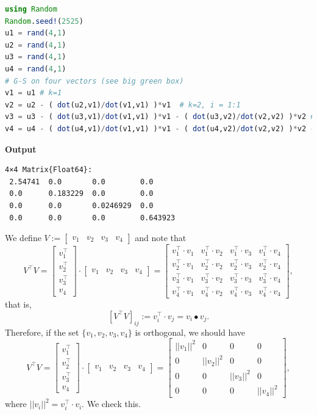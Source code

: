 \begin{lstlisting}[language=Julia,style=mystyle]
using Random
Random.seed!(2525)
u1 = rand(4,1)
u2 = rand(4,1)
u3 = rand(4,1)
u4 = rand(4,1)
# G-S on four vectors (see big green box)
v1 = u1 # k=1
v2 = u2 - ( dot(u2,v1)/dot(v1,v1) )*v1  # k=2, i = 1:1
v3 = u3 - ( dot(u3,v1)/dot(v1,v1) )*v1 - ( dot(u3,v2)/dot(v2,v2) )*v2 # k=3, i = 1:2
v4 = u4 - ( dot(u4,v1)/dot(v1,v1) )*v1 - ( dot(u4,v2)/dot(v2,v2) )*v2 - ( dot(u4,v3)/dot(v3,v3) )*v3 # k=4, i = 1:3
\end{lstlisting}
\textbf{Output} 
\begin{verbatim}
4×4 Matrix{Float64}:
 2.54741  0.0       0.0        0.0
 0.0      0.183229  0.0        0.0
 0.0      0.0       0.0246929  0.0
 0.0      0.0       0.0        0.643923
\end{verbatim}


We define $V:=\left[ \begin{array}{cccc} v_1 & v_2 & v_3 & v_4 \end{array} \right] $ and note that 
 $$V^\top V = \left[ \begin{array}{c} v_1^\top  \\ v_2^\top \\ v_3^\top \\ v_4 \end{array} \right] \cdot \left[ \begin{array}{cccc} v_1 & v_2 & v_3 & v_4 \end{array} \right] = \left[ \begin{array}{cccc}  
 v_1^\top \cdot v_1 &  v_1^\top \cdot v_2 &  v_1^\top \cdot v_3 &  v_1^\top \cdot v_4  \\
  v_2^\top \cdot v_1 &  v_2^\top \cdot v_2 &  v_2^\top \cdot v_3 &  v_2^\top \cdot v_4  \\
   v_3^\top \cdot v_1 &  v_3^\top \cdot v_2 &  v_3^\top \cdot v_3 &  v_3^\top \cdot v_4  \\
   v_4^\top \cdot v_1 &  v_4^\top \cdot v_2 &  v_4^\top \cdot v_3 &  v_4^\top \cdot v_4
 \end{array} 
  \right],$$
  that is, 
  $$\left[V^\top V \right]_{ij} := v_i^\top \cdot v_j = v_i \bullet v_j .$$
Therefore, if the set $\{ v_1, v_2, v_3, v_4\}$ is orthogonal, we should have
 $$V^\top V = \left[ \begin{array}{c} v_1^\top  \\ v_2^\top \\ v_3^\top \\ v_4 \end{array} \right] \cdot \left[ \begin{array}{cccc} v_1 & v_2 & v_3 & v_4 \end{array} \right] = \left[ \begin{array}{cccc}  
||v_1||^2 & 0 & 0 & 0 \\
0 & ||v_2||^2 & 0 & 0 \\
0 & 0 & ||v_3||^2 & 0\\
0 & 0 & 0 & ||v_4||^2
 \end{array} 
  \right],$$
  where $||v_i||^2 = v_i^\top \cdot v_i.$
We check this.\\
  
